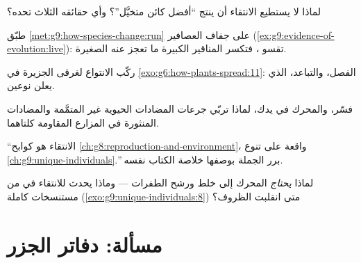 \begin{exercise}[$\star\star$]\label{exo:g9:how-species-change:7}
لماذا لا يستطيع الانتقاء أن ينتج ``أفضل كائن متخيَّل''؟
وأي حقائقه الثلاث تحده؟
\end{exercise}

\begin{exercise}[$\star\star$]\label{exo:g9:how-species-change:8}
طبّق \cref{met:g9:how-species-change:run} على جفاف
العصافير (\cref{ex:g9:evidence-of-evolution:live}): تقسو
، فتكسر المناقير الكبيرة ما تعجز عنه الصغيرة.
\end{exercise}

\begin{exercise}[$\star\star$]\label{exo:g9:how-species-change:9}
ركّب الانتواع لغرقى الجزيرة في
\cref{exo:g6:how-plants-spread:11}: الفصل، والتباعد،
 الذي يعلن نوعين.
\end{exercise}

\begin{exercise}[$\star\star$]\label{exo:g9:how-species-change:10}
فسّر، والمحرك في يدك، لماذا تربّي جرعات المضادات الحيوية
غير المتمَّمة والمضادات المنثورة في المزارع المقاومة
كلتاهما.
\end{exercise}

\begin{exercise}[$\star\star$]\label{exo:g9:how-species-change:11}
``الانتقاء هو كوابح
\cref{ch:g8:reproduction-and-environment}، واقعة على تنوع
\cref{ch:g9:unique-individuals}.'' برر الجملة بوصفها
خلاصة الكتاب نفسه.
\end{exercise}

\begin{exercise}[$\star\star\star$]\label{exo:g9:how-species-change:12}
لماذا \emph{يحتاج} المحرك إلى خلط  ورشح
الطفرات --- وماذا يحدث للانتقاء في  من مستنسخات
كاملة (\cref{exo:g9:unique-individuals:8}) متى انقلبت
الظروف؟
\end{exercise}

\section{مسألة: دفاتر الجزر}

